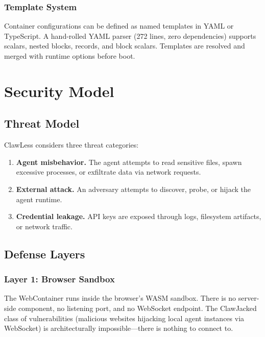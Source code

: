 \documentclass[11pt,twocolumn]{article}
\begin{document}
\subsubsection{Template System}

Container configurations can be defined as named templates in YAML or TypeScript. A hand-rolled YAML parser (272 lines, zero dependencies) supports scalars, nested blocks, records, and block scalars. Templates are resolved and merged with runtime options before boot.

\section{Security Model}
\label{sec:security}

\subsection{Threat Model}

ClawLess considers three threat categories:

\begin{enumerate}[noitemsep]
  \item \textbf{Agent misbehavior.} The agent attempts to read sensitive files, spawn excessive processes, or exfiltrate data via network requests.
  \item \textbf{External attack.} An adversary attempts to discover, probe, or hijack the agent runtime.
  \item \textbf{Credential leakage.} API keys are exposed through logs, filesystem artifacts, or network traffic.
\end{enumerate}

\subsection{Defense Layers}

\subsubsection{Layer 1: Browser Sandbox}

The WebContainer runs inside the browser's WASM sandbox. There is no server-side component, no listening port, and no WebSocket endpoint. The ClawJacked class of vulnerabilities (malicious websites hijacking local agent instances via WebSocket) is architecturally impossible---there is nothing to connect to.
\end{document}
